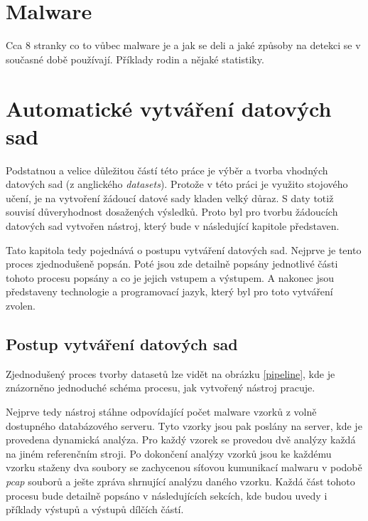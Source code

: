 \chapter{Malware} \label{2.chap}
Cca 8 stranky co to vůbec malware je a jak se deli a jaké způsoby na detekci se v současné době používají.
Příklady rodin a nějaké statistiky.


\chapter{Automatické vytváření datových sad} \label{3.chap}

Podstatnou a velice důležitou částí této práce je výběr a tvorba vhodných datových sad (z anglického \textit{datasets}).
Protože v této práci je využito stojového učení, je na vytvoření žádoucí datové sady kladen velký důraz. 
S daty totiž souvisí důveryhodnost dosažených výsledků.
Proto byl pro tvorbu žádoucích datových sad vytvořen nástroj, který bude v následující kapitole představen. 

Tato kapitola tedy pojednává o postupu vytváření datových sad. Nejprve je tento proces zjednodušeně popsán.
Poté jsou zde detailně popsány jednotlivé části tohoto procesu popsány a co je jejich vstupem a výstupem.
A nakonec jsou představeny technologie a programovací jazyk, který byl pro toto vytváření zvolen. 


\section{Postup vytváření datových sad}
Zjednodušený proces tvorby datasetů lze vidět na obrázku \ref{pipeline}, kde je znázorněno jednoduché schéma procesu, jak vytvořený nástroj pracuje. 

Nejprve tedy nástroj stáhne odpovídající počet malware vzorků z volně dostupného databázového serveru. Tyto vzorky jsou pak poslány na server, kde je provedena dynamická analýza.
Pro každý vzorek se provedou dvě analýzy každá na jiném referenčním stroji.
Po dokončení analýzy vzorků jsou ke každému vzorku staženy dva soubory se zachycenou síťovou kumunikací malwaru v podobě \textit{pcap} souborů a ješte zpráva shrnující analýzu daného vzorku.
Každá část tohoto procesu bude detailně popsáno v následujících sekcích, kde budou uvedy i příklady výstupů a výstupů dílčích částí.\\

